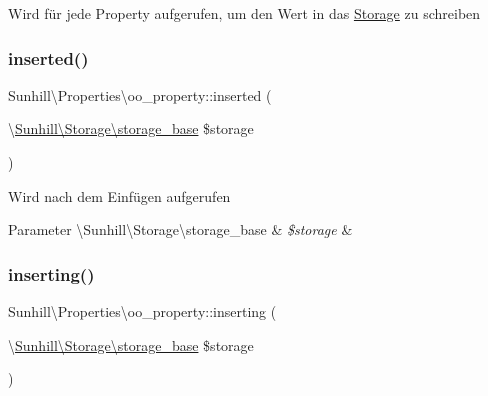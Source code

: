 Wird für jede Property aufgerufen, um den Wert in das \hyperlink{namespaceSunhill_1_1Storage}{Storage} zu schreiben \mbox{\label{classSunhill_1_1Properties_1_1oo__property_ade3733dec92e3172e02c930d62f74a8a}} 
\subsubsection{\texorpdfstring{inserted()}{inserted()}}
{\footnotesize\ttfamily Sunhill\textbackslash{}\+Properties\textbackslash{}oo\+\_\+property\+::inserted (\begin{DoxyParamCaption}\item[{\textbackslash{}\hyperlink{classSunhill_1_1Storage_1_1storage__base}{Sunhill\textbackslash{}\+Storage\textbackslash{}storage\+\_\+base}}]{\$storage }\end{DoxyParamCaption})}

Wird nach dem Einfügen aufgerufen 
\begin{DoxyParams}[1]{Parameter}
\textbackslash{}\+Sunhill\textbackslash{}\+Storage\textbackslash{}storage\+\_\+base & {\em \$storage} & \\
\hline
\end{DoxyParams}
\mbox{\label{classSunhill_1_1Properties_1_1oo__property_a67f13a47883c6503973a869ea42b7081}} 
\subsubsection{\texorpdfstring{inserting()}{inserting()}}
{\footnotesize\ttfamily Sunhill\textbackslash{}\+Properties\textbackslash{}oo\+\_\+property\+::inserting (\begin{DoxyParamCaption}\item[{\textbackslash{}\hyperlink{classSunhill_1_1Storage_1_1storage__base}{Sunhill\textbackslash{}\+Storage\textbackslash{}storage\+\_\+base}}]{\$storage }\end{DoxyParamCaption})}

